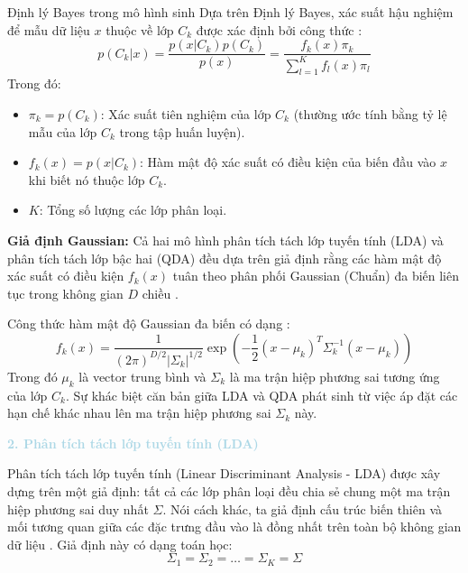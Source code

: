 \begin{infobox}{Định lý Bayes trong mô hình sinh}
Dựa trên Định lý Bayes, xác suất hậu nghiệm để mẫu dữ liệu $x$ thuộc về lớp $C_k$ được xác định bởi công thức \cite{bishop2006pattern}:
\begin{equation}
    p(C_k|x) = \frac{p(x|C_k) p(C_k)}{p(x)} = \frac{f_k(x)\pi_k}{\sum_{l=1}^K f_l(x)\pi_l}
\end{equation}
Trong đó:
\begin{itemize}
    \item $\pi_k = p(C_k)$: Xác suất tiên nghiệm của lớp $C_k$ (thường ước tính bằng tỷ lệ mẫu của lớp $C_k$ trong tập huấn luyện).
    \item $f_k(x) = p(x|C_k)$: Hàm mật độ xác suất có điều kiện của biến đầu vào $x$ khi biết nó thuộc lớp $C_k$.
    \item $K$: Tổng số lượng các lớp phân loại.
\end{itemize}
\end{infobox}

\textbf{Giả định Gaussian:} Cả hai mô hình phân tích tách lớp tuyến tính (LDA) và phân tích tách lớp bậc hai (QDA) đều dựa trên giả định rằng các hàm mật độ xác suất có điều kiện $f_k(x)$ tuân theo phân phối Gaussian (Chuẩn) đa biến liên tục trong không gian $D$ chiều \cite{bishop2006pattern}.

Công thức hàm mật độ Gaussian đa biến có dạng \cite{tezekbayev2019linear}:
\begin{equation}
    f_k(x) = \frac{1}{(2\pi)^{D/2} |\Sigma_k|^{1/2}} \exp\left(-\frac{1}{2}(x-\mu_k)^T \Sigma_k^{-1} (x-\mu_k)\right)
\end{equation}
Trong đó $\mu_k$ là vector trung bình và $\Sigma_k$ là ma trận hiệp phương sai tương ứng của lớp $C_k$. Sự khác biệt căn bản giữa LDA và QDA phát sinh từ việc áp đặt các hạn chế khác nhau lên ma trận hiệp phương sai $\Sigma_k$ này.

\vspace{0.5em}
\noindent\textcolor{lightblue}{\textbf{2. Phân tích tách lớp tuyến tính (LDA)}}
\vspace{0.5em}

Phân tích tách lớp tuyến tính (Linear Discriminant Analysis - LDA) được xây dựng trên một giả định: tất cả các lớp phân loại đều chia sẻ chung một ma trận hiệp phương sai duy nhất $\Sigma$. Nói cách khác, ta giả định cấu trúc biến thiên và mối tương quan giữa các đặc trưng đầu vào là đồng nhất trên toàn bộ không gian dữ liệu \cite{tezekbayev2019linear}.
Giả định này có dạng toán học:
\begin{equation}
    \Sigma_1 = \Sigma_2 = \dots = \Sigma_K = \Sigma
\end{equation}

